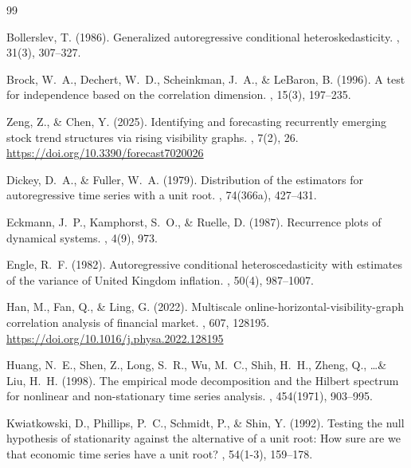 \documentclass[11pt,a4paper]{article}
\begin{document}
\begin{thebibliography}{99}

Bollerslev, T. (1986).
\newblock Generalized autoregressive conditional heteroskedasticity.
, 31(3), 307--327.

Brock, W.~A., Dechert, W.~D., Scheinkman, J.~A., \& LeBaron, B. (1996).
\newblock A test for independence based on the correlation dimension.
, 15(3), 197--235.

Zeng, Z., \& Chen, Y. (2025).
\newblock Identifying and forecasting recurrently emerging stock trend structures via rising visibility graphs.
, 7(2), 26.
\newblock \url{https://doi.org/10.3390/forecast7020026}

Dickey, D.~A., \& Fuller, W.~A. (1979).
\newblock Distribution of the estimators for autoregressive time series with a unit root.
, 74(366a), 427--431.

Eckmann, J.~P., Kamphorst, S.~O., \& Ruelle, D. (1987).
\newblock Recurrence plots of dynamical systems.
, 4(9), 973.

Engle, R.~F. (1982).
\newblock Autoregressive conditional heteroscedasticity with estimates of the variance of United Kingdom inflation.
, 50(4), 987--1007.

Han, M., Fan, Q., \& Ling, G. (2022).
\newblock Multiscale online-horizontal-visibility-graph correlation analysis of financial market.
, 607, 128195.
\newblock \url{https://doi.org/10.1016/j.physa.2022.128195}

Huang, N.~E., Shen, Z., Long, S.~R., Wu, M.~C., Shih, H.~H., Zheng, Q., \ldots \& Liu, H.~H. (1998).
\newblock The empirical mode decomposition and the Hilbert spectrum for nonlinear and non-stationary time series analysis.
, 454(1971), 903--995.

Kwiatkowski, D., Phillips, P.~C., Schmidt, P., \& Shin, Y. (1992).
\newblock Testing the null hypothesis of stationarity against the alternative of a unit root: How sure are we that economic time series have a unit root?
, 54(1-3), 159--178.


\end{thebibliography}
\end{document}
